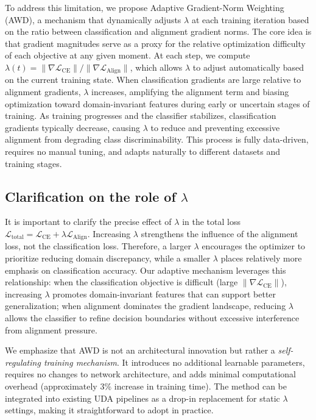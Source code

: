 \documentclass[pdflatex,sn-mathphys-num]{sn-jnl}
\theoremstyle{thmstyleone}
\theoremstyle{thmstyletwo}
\theoremstyle{thmstylethree}
\begin{document}
To address this limitation, we propose Adaptive Gradient-Norm Weighting (AWD), a mechanism that dynamically adjusts $\lambda$ at each training iteration based on the ratio between classification and alignment gradient norms. The core idea is that gradient magnitudes serve as a proxy for the relative optimization difficulty of each objective at any given moment. At each step, we compute $\lambda(t) = \|\nabla \mathcal{L}_{\text{CE}}\| / \|\nabla \mathcal{L}_{\text{Align}}\|$, which allows $\lambda$ to adjust automatically based on the current training state. When classification gradients are large relative to alignment gradients, $\lambda$ increases, amplifying the alignment term and biasing optimization toward domain-invariant features during early or uncertain stages of training. As training progresses and the classifier stabilizes, classification gradients typically decrease, causing $\lambda$ to reduce and preventing excessive alignment from degrading class discriminability. This process is fully data-driven, requires no manual tuning, and adapts naturally to different datasets and training stages.

\subsection{Clarification on the role of \texorpdfstring{$\lambda$}{lambda}}
It is important to clarify the precise effect of $\lambda$ in the total loss $\mathcal{L}_{\text{total}} = \mathcal{L}_{\text{CE}} + \lambda \mathcal{L}_{\text{Align}}$. Increasing $\lambda$ strengthens the influence of the alignment loss, not the classification loss. Therefore, a larger $\lambda$ encourages the optimizer to prioritize reducing domain discrepancy, while a smaller $\lambda$ places relatively more emphasis on classification accuracy. Our adaptive mechanism leverages this relationship: when the classification objective is difficult (large $\|\nabla \mathcal{L}_{\text{CE}}\|$), increasing $\lambda$ promotes domain-invariant features that can support better generalization; when alignment dominates the gradient landscape, reducing $\lambda$ allows the classifier to refine decision boundaries without excessive interference from alignment pressure.

We emphasize that AWD is not an architectural innovation but rather a \emph{self-regulating training mechanism}. It introduces no additional learnable parameters, requires no changes to network architecture, and adds minimal computational overhead (approximately 3\% increase in training time). The method can be integrated into existing UDA pipelines as a drop-in replacement for static $\lambda$ settings, making it straightforward to adopt in practice.
\end{document}
